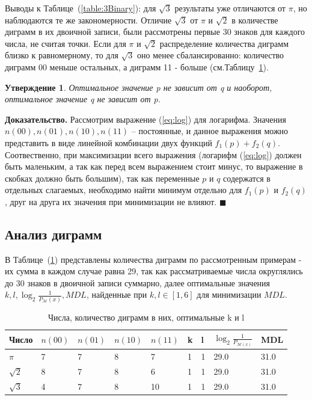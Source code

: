 \documentclass[12pt]{article}
\newtheorem{sttm}{Утверждение}
\newcommand{\qed}{\hfill $\blacksquare$}
\begin{document}
	Выводы к Таблице~(\ref{table:3Binary}): для $\sqrt{3}$ результаты уже отличаются от $\pi$, но наблюдаются те же закономерности. Отличие $\sqrt{3}$ от $\pi$ и $\sqrt{2}$ в количестве диграмм в их двоичной записи, были рассмотрены первые 30 знаков для каждого числа, не считая точки. Если для $\pi$ и $\sqrt{2}$ распределение количества диграмм близко к равномерному, то для $\sqrt{3}$ оно менее сбалансированно: количество диграмм 00 меньше остальных, а диграмм 11 - больше (см.Таблицу~\ref{table:digramsPi23}).
	
	\begin{sttm}\label{sttm:independence} Оптимальное значение p не зависит от q и наоборот, оптимальное значение q не зависит от p.
	\end{sttm}
	{\bf Доказательство.} Рассмотрим выражение (\ref{eq:log}) для логарифма. Значения $n(00), n(01), n(10), n(11)$ -- постоянные, и данное выражения можно представить в виде линейной комбинации двух функций $f_1(p)+f_2(q)$. Соотвественно, при максимизации всего выражения (логарифм (\ref{eq:log}) должен быть маленьким, а так как перед всем выражением стоит минус, то выражение в скобках должно быть большим), так как переменные $p$ и $q$ содержатся в отдельных слагаемых, необходимо найти минимум отдельно для $f_1(p)$ и $f_2(q)$, друг на друга их значения при минимизации не влияют. \qed
	
	\subsection{Анализ диграмм}
	В Таблице~(\ref{table:digramsPi23}) представлены количества диграмм по рассмотренным примерам - их сумма в каждом случае равна 29, так как рассматриваемые числа округлялись до 30 знаков в двоичной записи суммарно, далее оптимальные значения $k,l,\log_2{\frac{1}{P_{\mathcal{M}}(x)}},MDL$, найденные при $k,l\in[1,6]$ для минимизации $MDL$.
	
	\begin{table}[!h]
		\caption{Числа, количество диграмм в них, оптимальные k и l}
		\label{table:digramsPi23}
		\begin{center}
			\begin{tabular}{|l|l|l|l|l|l|l|l|l|}
				\hline
				Число & $n(00)$ & $n(01)$ & $n(10)$ & $n(11)$ & k & l & $\log_2{\frac{1}{P_{\mathcal{M}(x)}}}$ & MDL \\
				\hline
				$\pi$ & 7 & 7 & 8 & 7 & 1 & 1 & 29.0 & 31.0\\
				\hline
				$\sqrt{2}$ & 8 & 7 & 8 & 6 & 1 & 1 & 29.0 & 31.0\\
				\hline
				$\sqrt{3}$ & 4 & 7 & 8 & 10 & 1 & 1 & 29.0 & 31.0\\
				\hline
			\end{tabular}
		\end{center}
	\end{table}
	
\end{document}
